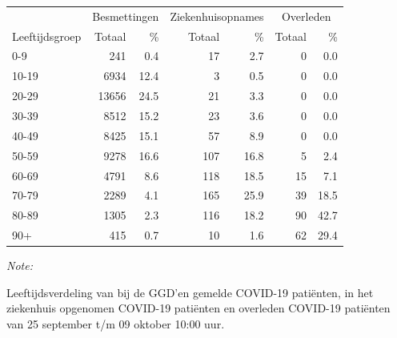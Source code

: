 \documentclass[
  english,
  man,floatsintext]{apa6}
\begin{document}
\begin{table}[H]
\centering\begingroup\fontsize{11}{13}\selectfont

\begin{threeparttable}
\begin{tabular}{lrrrrrr}
\toprule
\multicolumn{1}{c}{ } & \multicolumn{2}{c}{Besmettingen} & \multicolumn{2}{c}{Ziekenhuisopnames} & \multicolumn{2}{c}{Overleden} \\
\cmidrule(l{3pt}r{3pt}){2-3} \cmidrule(l{3pt}r{3pt}){4-5} \cmidrule(l{3pt}r{3pt}){6-7}
Leeftijdsgroep & Totaal & \% & Totaal & \% & Totaal & \%\\
\midrule
0-9 & 241 & 0.4 & 17 & 2.7 & 0 & 0.0\\
10-19 & 6934 & 12.4 & 3 & 0.5 & 0 & 0.0\\
20-29 & 13656 & 24.5 & 21 & 3.3 & 0 & 0.0\\
30-39 & 8512 & 15.2 & 23 & 3.6 & 0 & 0.0\\
40-49 & 8425 & 15.1 & 57 & 8.9 & 0 & 0.0\\
50-59 & 9278 & 16.6 & 107 & 16.8 & 5 & 2.4\\
60-69 & 4791 & 8.6 & 118 & 18.5 & 15 & 7.1\\
70-79 & 2289 & 4.1 & 165 & 25.9 & 39 & 18.5\\
80-89 & 1305 & 2.3 & 116 & 18.2 & 90 & 42.7\\
90+ & 415 & 0.7 & 10 & 1.6 & 62 & 29.4\\
\bottomrule
\end{tabular}
\begin{tablenotes}
\item \textit{Note: } 
\item Leeftijdsverdeling van bij de GGD’en gemelde COVID-19 patiënten, in het ziekenhuis opgenomen COVID-19 patiënten en overleden COVID-19 patiënten van 25 september t/m 09 oktober 10:00 uur.
\end{tablenotes}
\end{threeparttable}
\endgroup{}
\end{table}
\end{document}
